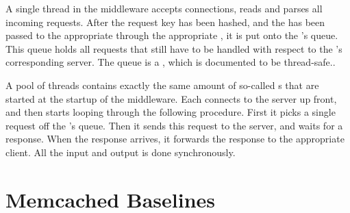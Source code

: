 \documentclass[11pt]{article}
\begin{document}
%

A single thread in the middleware accepts connections, reads and parses all incoming requests.
After the request key has been hashed, and the  has been passed to the appropriate  through the appropriate , it is put onto the 's queue.
This queue holds all requests that still have to be handled with respect to the 's corresponding server.
The queue is a , which is documented to be thread-safe.\cite{javaBlockingQueueSafe}.

A pool of threads contains exactly the same amount of so-called s that are started at the startup of the middleware.
Each  connects to the server up front, and then starts looping through the following procedure.
First it picks a single request off the 's queue.
Then it sends this request to the server, and waits for a response.
When the response arrives, it forwards the response to the appropriate client.
All the input and output is done synchronously.


\section{Memcached Baselines}\label{sec:baseline}

\end{document}
